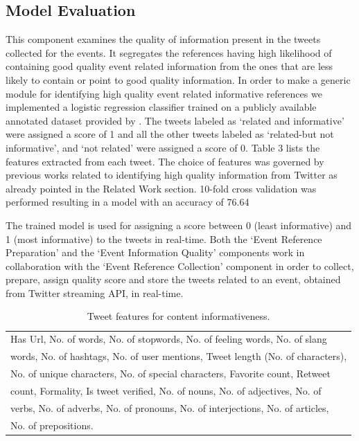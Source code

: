 \subsection{Model Evaluation}
This component examines the quality of information present in the tweets collected for the events. It segregates the references having high likelihood of containing good quality event related information from the ones that are less likely to contain or point to good quality information. In order to make a generic module for identifying high quality event related informative references we implemented a logistic regression classifier trained on a publicly available annotated dataset provided by \cite{olteanu2014crisislex}. The tweets labeled as ‘related and informative’ were assigned a score of 1 and all the other tweets labeled as ‘related-but not informative’, and ‘not related’ were assigned a score of 0. Table 3 lists the features extracted from each tweet. The choice of features was governed by previous works related to identifying high quality information from Twitter as already pointed in the Related Work section. 10-fold cross validation was performed resulting in a model with an accuracy of 76.64%

The trained model is used for assigning a score between 0 (least informative) and 1 (most informative) to the tweets in real-time. Both the ‘Event Reference Preparation’ and the ‘Event Information Quality’ components work in collaboration with the ‘Event Reference Collection’ component in order to collect, prepare, assign quality score and store the tweets related to an event, obtained from Twitter streaming API, in real-time.

\begin{savenotes}
\begin{table}[ht]
\centering
\caption{Tweet features for content informativeness.}
\label{tweetfeature}
\begin{tabular}{|l|}
\hline
Has Url, No. of words, No. of stopwords, No. of feeling words, No. of slang \\ 
words, No. of hashtags, No. of user mentions, Tweet  length (No. of characters),\\  No. of unique 
characters, No. of special characters, Favorite count, Retweet \\ count, Formality, Is tweet verified, No. of nouns, No. of adjectives, No. of \\ verbs, No. of adverbs, No. of pronouns, No. of interjections, No. of articles, \\ No. of prepositions.
 \\ \hline
\end{tabular}
\end{table}
\end{savenotes}

